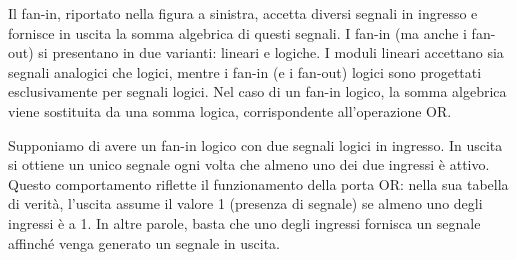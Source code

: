 \begin{figure}[H]
   \centering
\end{figure}

\vspace{-0.2cm}Il fan-in, riportato nella figura a sinistra, accetta diversi segnali in ingresso e fornisce in uscita la somma algebrica di questi segnali. I fan-in (ma anche i fan-out) si presentano in due varianti: lineari e logiche. I moduli lineari accettano sia segnali analogici che logici, mentre i fan-in (e i fan-out) logici sono progettati esclusivamente per segnali logici. Nel caso di un fan-in logico, la somma algebrica viene sostituita da una somma logica, corrispondente all'operazione OR.

Supponiamo di avere un fan-in logico con due segnali logici in ingresso. In uscita si ottiene un unico segnale ogni volta che almeno uno dei due ingressi è attivo. Questo comportamento riflette il funzionamento della porta OR: nella sua tabella di verità, l'uscita assume il valore 1 (presenza di segnale) se almeno uno degli ingressi è a 1. In altre parole, basta che uno degli ingressi fornisca un segnale affinché venga generato un segnale in uscita.

